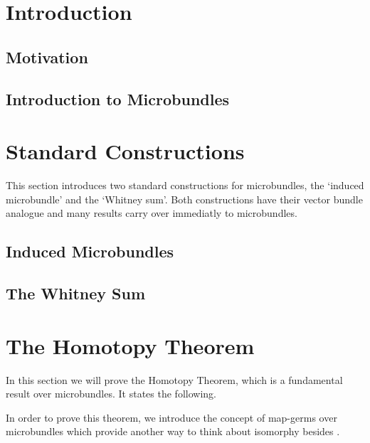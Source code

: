 \documentclass{article}
\begin{document}


\tableofcontents
\clearpage
\section{Introduction}\label{chapter::introduction}
\subsection*{Motivation}\label{section::motivation}{\blankbreak}

\subsection*{Introduction to Microbundles}\label{section::microbundle}{\blankbreak}

\section{Standard Constructions}\label{chapter::constructions}
\begin{myparagraph}
    This section introduces two standard constructions for microbundles,
    the `induced microbundle' and the `Whitney sum'.
    Both constructions have their vector bundle analogue
    and many results carry over immediatly to microbundles.
\end{myparagraph}
\subsection*{Induced Microbundles}\label{section::induced}{\blankbreak}

\subsection*{The Whitney Sum}\label{section::whitney}

\section{The Homotopy Theorem}\label{chapter::homotopy}
\begin{myparagraph}
    In this section we will prove the Homotopy Theorem,
    which is a fundamental result over microbundles.
    It states the following.
\end{myparagraph}

\begin{myparagraph}
    In order to prove this theorem,
    we introduce the concept of map-germs
    over microbundles which provide another way
    to think about isomorphy besides .
\end{myparagraph}


\end{document}

